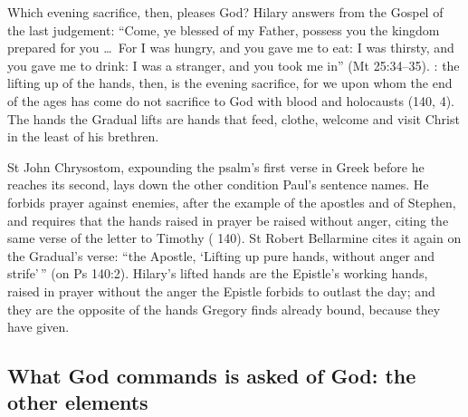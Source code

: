 Which evening sacrifice, then, pleases God? Hilary answers from the Gospel of
the last judgement: ``Come, ye blessed of my Father, possess you the kingdom
prepared for you \dots\ For I was hungry, and you gave me to eat: I was
thirsty, and you gave me to drink: I was a stranger, and you took me in''
(Mt 25:34--35). : the lifting up of the hands, then, is the evening
sacrifice, for we upon whom the end of the ages has come do not sacrifice to
God with blood and holocausts (140, 4). The hands the Gradual lifts are hands
that feed, clothe, welcome and visit Christ in the least of his brethren.

St John Chrysostom, expounding the psalm's first verse in Greek before he
reaches its second, lays down the other condition Paul's sentence names. He
forbids prayer against enemies, after the example of the apostles and of
Stephen, and requires that the hands raised in prayer be raised without anger,
citing the same verse of the letter to Timothy (
140). St Robert Bellarmine cites it again on the Gradual's verse: ``the
Apostle, `Lifting up pure hands, without anger and strife'\,'' (on Ps 140:2).
Hilary's lifted hands are the Epistle's working hands, raised in prayer
without the anger the Epistle forbids to outlast the day; and they are the
opposite of the hands Gregory finds already bound, because they have given.

\subsection{What God commands is asked of God: the other elements}

